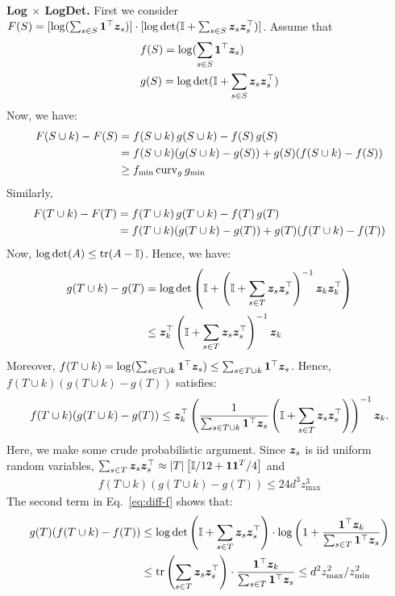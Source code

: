 \documentclass{article}
\newcommand{\xhdr}[1]{\noindent\textbf{#1.}}
\begin{document}
\xhdr{Log $\times$ LogDet}
First we consider $F(S) = [\log (\sum_{s\in S} \bm{1}^\top \bm{z}_s)]\cdot[\log \text{det}(\mathbb{I}+\sum_{s\in S}\bm{z}_s \bm{z}_s ^\top)]$. Assume that
\begin{align}
    &f(S) = \log (\sum_{s\in S} \bm{1}^\top \bm{z}_s) \nonumber\\
    &g(S) = \log \text{det}(\mathbb{I}+\sum_{s\in S}\bm{z}_s \bm{z}_s ^\top)
\end{align}
Now, we have: 
\begin{align}
F(S\cup k) - F(S) & = f(S\cup k)\, g(S\cup k)-f(S)\, g(S)\nonumber\\
& =  f(S\cup k) (g(S\cup k)- g(S)) + g(S) (f(S\cup k)- f(S))\nonumber \\ 
& \ge f_{\min} \, \text{curv}_{g} \, g_{\min} 
\end{align}
Similarly,
\begin{align}
F(T\cup k) - F(T) & = f(T\cup k)\, g(T\cup k)-f(T)\, g(T)\nonumber\\
& =  f(T\cup k) (g(T\cup k)- g(T)) + g(T) (f(T\cup k)- f(T)) \label{eq:diff-f}
\end{align}
Now, $\log \det (A) \le \mathop{\mathrm{tr}}(A-\mathbb{I})$. Hence, we have:
\begin{align}
    g(T\cup k)- g(T) & = \log \det\left( \mathbb{I} + \left( \mathbb{I} + \sum_{s\in T}\bm{z}_s \bm{z}_s ^\top \right)^{-1} \bm{z}_k \bm{z}_k ^{\top} \right) \nonumber\\
    & \le \bm{z}_k ^{\top} \left( \mathbb{I} + \sum_{s\in T} \bm{z}_s \bm{z}_s ^\top \right)^{-1} \bm{z}_k 
\end{align}
Moreover, $f(T \cup k) = \log (\sum_{s\in T \cup k} \bm{1}^\top \bm{z}_s) \le \sum_{s\in T \cup k} \bm{1}^\top \bm{z}_s $. Hence, $f(T\cup k) (g(T\cup k)- g(T))$ satisfies:
\begin{align}
    f(T\cup k) (g(T\cup k)- g(T)) \le  \bm{z}_k ^{\top} \left( \frac{1}{\sum_{s\in T \cup k} \bm{1}^\top \bm{z}_s}\left(\mathbb{I} + \sum_{s\in T} \bm{z}_s \bm{z}_s ^\top \right)\right)^{-1} \bm{z}_k . 
\end{align}
Here, we make some crude probabilistic  argument.
Since $\bm{z}_s$ is iid uniform random variables, 
$\sum_{s\in T}  \bm{z}_s \bm{z}_s ^\top  \approx |T|\left[\mathbb{I}/12 + \bm{1}\bm{1} ^T/4\right] $ and 
\begin{align}
f(T\cup k) (g(T\cup k)- g(T)) \le {24d^3 z^3 _{\max}}   
\end{align} 
The second term in Eq.~\eqref{eq:diff-f} shows that:
\begin{align}
    g(T) (f(T\cup k)- f(T)) & \le  \log \text{det}\left(\mathbb{I}+\sum_{s\in T}\bm{z}_s \bm{z}_s ^\top\right) \cdot \log\left(1 + \frac{\bm{1}^{\top}\bm{z}_k}  {\sum_{s\in T} \bm{1}^{\top}\bm{z}_s}\right) \nonumber\\
    & \le \mathop{\mathrm{tr}}\left( \sum_{s\in T}\bm{z}_s \bm{z}_s ^\top\right)\cdot \frac{\bm{1}^{\top}\bm{z}_k}  {\sum_{s\in T} \bm{1}^{\top}\bm{z}_s} \le d^2 z_{\max} ^2 / z_{\min} ^2
\end{align}
\end{document}
